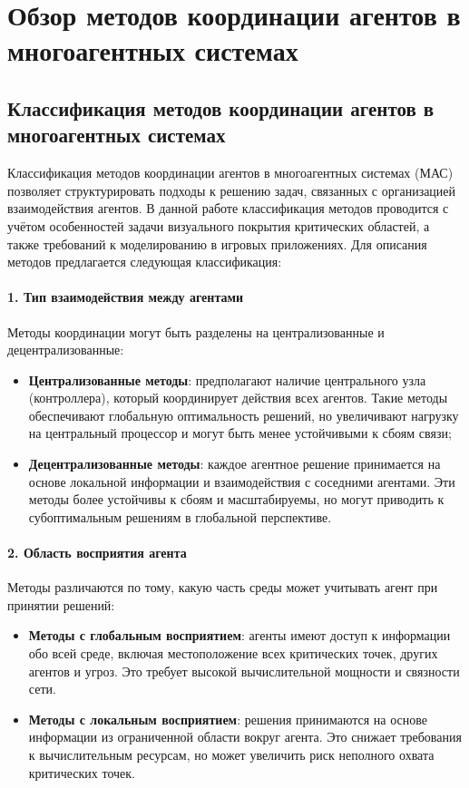 \chapter{Обзор методов координации агентов в многоагентных системах}

\section{Классификация методов координации агентов в многоагентных системах}

Классификация методов координации агентов в многоагентных системах (МАС) позволяет структурировать подходы к решению задач, связанных с организацией взаимодействия агентов.
В данной работе классификация методов проводится с учётом особенностей задачи визуального покрытия критических областей, а также требований к моделированию в игровых приложениях. Для описания методов предлагается следующая классификация:

\subsubsection*{1. Тип взаимодействия между агентами}
Методы координации могут быть разделены на централизованные и децентрализованные:
\begin{itemize}
	\item \textbf{Централизованные методы}: предполагают наличие центрального узла (контроллера), который координирует действия всех агентов.
	Такие методы обеспечивают глобальную оптимальность решений, но увеличивают нагрузку на центральный процессор и могут быть менее устойчивыми к сбоям связи;
	\item \textbf{Децентрализованные методы}: каждое агентное решение принимается на основе локальной информации и взаимодействия с соседними агентами.
	Эти методы более устойчивы к сбоям и масштабируемы, но могут приводить к субоптимальным решениям в глобальной перспективе.
\end{itemize}

\subsubsection*{2. Область восприятия агента}
Методы различаются по тому, какую часть среды может учитывать агент при принятии решений:
\begin{itemize}
	\item \textbf{Методы с глобальным восприятием}: агенты имеют доступ к информации обо всей среде, включая местоположение всех критических точек, других агентов и угроз.
	Это требует высокой вычислительной мощности и связности сети.  
	\item \textbf{Методы с локальным восприятием}: решения принимаются на основе информации из ограниченной области вокруг агента.
	Это снижает требования к вычислительным ресурсам, но может увеличить риск неполного охвата критических точек.
\end{itemize}

